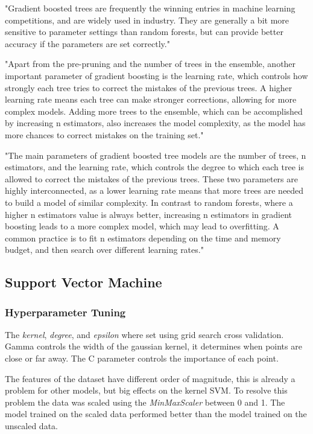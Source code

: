 "Gradient boosted trees are frequently the winning entries in machine
learning competitions, and are widely used in industry. They are
generally a bit more sensitive to parameter settings than random
forests, but can provide better accuracy if the parameters are set
correctly." \cite[p. 88-89]{muller_introductionmachinelearning_2016}

"Apart from the pre-pruning and the number of trees in the ensemble,
another important parameter of gradient boosting is the learning rate,
which controls how strongly each tree tries to correct the mistakes of
the previous trees. A higher learning rate means each tree can make
stronger corrections, allowing for more complex models. Adding more trees to the ensemble, which
can be accomplished
by increasing
n estimators, also increases the model complexity, as the model has
more chances to correct mistakes on the training set." \cite[p.
88-89]{muller_introductionmachinelearning_2016}

"The main parameters of gradient boosted tree models are the number
of trees, n estimators, and the learning rate, which controls the degree to which each tree is
allowed to correct the
mistakes of the previous trees.
These two parameters are highly interconnected, as a lower
learning rate means that more trees are needed to build a model of
similar complexity. In contrast to random forests, where a higher
n estimators value is always better, increasing n estimators in gradient
boosting leads to a more complex model, which may lead to overfitting. A
common practice is to fit n estimators depending on the time and
memory budget, and then search over different learning rates." \cite[p.
88-89]{muller_introductionmachinelearning_2016}

\subsection{Support Vector Machine}\label{subsec:support-vector-machine}

\subsubsection*{Hyperparameter Tuning}
The \textit{kernel}, \textit{degree},  and \textit{epsilon} where set using grid
search cross validation.
Gamma controls the width of the gaussian kernel, it determines when points are close or far away.
The C parameter controls the importance of each point.

The features of the dataset have different order of magnitude, this is already a problem for other
models, but big effects on the kernel \ac{SVM}.
To resolve this problem the data was scaled using the \textit{MinMaxScaler} between 0 and 1.
The model trained on the scaled data performed better than the model trained on the unscaled data.

